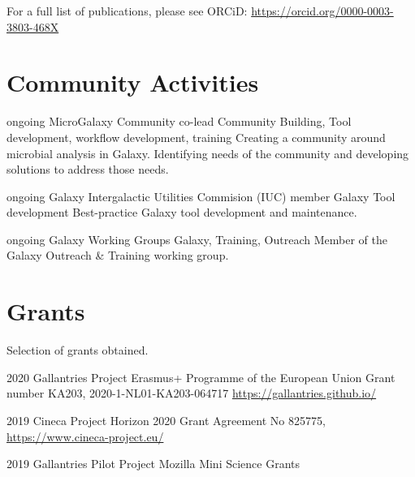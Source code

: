 \documentclass[]{shiltemann-cv}
\begin{document}
For a full list of publications, please see ORCiD: \url{https://orcid.org/0000-0003-3803-468X}

\section{Community Activities}
\begin{entrylist}
\entry
  {ongoing}
  {MicroGalaxy Community co-lead}
  {Community Building, Tool development, workflow development, training }
  {Creating a community around microbial analysis in Galaxy. Identifying needs of the community and developing solutions to address those needs.}

\end{entrylist}
\begin{entrylist}

\entry
  {ongoing}
  {Galaxy Intergalactic Utilities Commision (IUC) member}
  {Galaxy Tool development}
  {Best-practice Galaxy tool development and maintenance.}
  {}


\end{entrylist}
\begin{entrylist}

\entry
  {ongoing}
  {Galaxy Working Groups}
  {Galaxy, Training, Outreach}
  {Member of the Galaxy Outreach \& Training working group. }
  {}

\end{entrylist}

\section{Grants}
Selection of grants obtained.

\begin{entrylist}

\entry
  {2020}
  {Gallantries Project}
  {Erasmus+ Programme of the European Union}
  {Grant number KA203, 2020-1-NL01-KA203-064717 \url{https://gallantries.github.io/}}

\end{entrylist}
\begin{entrylist}

\entry
  {2019}
  {Cineca Project}
  {Horizon 2020}
  {Grant Agreement No 825775, \url{https://www.cineca-project.eu/} }

\end{entrylist}
\begin{entrylist}

\entry
  {2019}
  {Gallantries Pilot Project}
  {Mozilla Mini Science Grants}
  {}
\end{entrylist}
\end{document}
